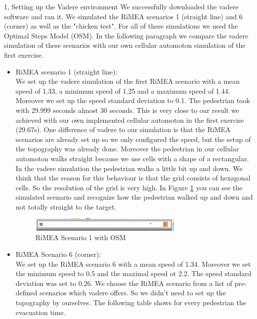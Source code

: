 \documentclass[10pt,a4paper]{article}
\begin{document}
\frontpage

\begin{task}{1, Setting up the Vadere environment}
We successfully downloaded the vadere software and ran it. We simulated the RiMEA scenarios 1 (straight line) and 6 (corner) as well as the "chicken test". For all of these simulations we used the Optimal Steps Model (OSM).
In the following paragraph we compare the vadere simulation of  these scenarios with our own cellular automoton simulation of the first exercise.
\begin{itemize}
    \item RiMEA scenario 1 (straight line): \\
    We set up the vadere simulation of the first RiMEA scenario with a mean speed of 1.33, a minimum speed of 1.25 and a maximum speed of 1.44. Moreover we set up the speed standard deviation to 0.1.
    The pedestrian took with 29.999 seconds almost 30 seconds. This is very close to our result we achieved with our own implemented cellular automoton in the first exercise (29.67s). One  difference of vadere to our simulation is that the RiMEA scenarios are already set up so we only configured the speed, but the setup of the topography was already done. Moreover the pedestrian in our cellular automoton walks straight because we use cells with a shape of a rectangular. In the vadere simulation the pedestrian walks a little bit up and down. We think that the reason for this behaviour is that the grid consists of hexagonal cells. So the resolution of the grid is very high. In Figure \ref{fig:rimea1_osm} you can see the simulated scenario and recognize how the pedestrian walked up and down and not totally straight to the target.
     \begin{figure}[H]
        \centering
        \includegraphics[width=0.7\textwidth]{pictures/osm/rimeatest1.png}
        \caption{RiMEA Scenario 1 with OSM}
        \label{fig:rimea1_osm}
    \end{figure}
    \item RiMEA Scenario 6 (corner):\\
    We set up the RiMEA scenario 6 with a mean speed of 1.34. Moreover we set the minimum speed to 0.5 and the maximal speed ot 2.2. The speed standard deviation was set to 0.26. We choose the RiMEA scenario from a list of pre-defined scenarios which vadere offers. So we didn't need to set up the topography by ourselves. The following table shows for every pedestrian the evacuation time.

\end{itemize}
\end{task}
\end{document}
